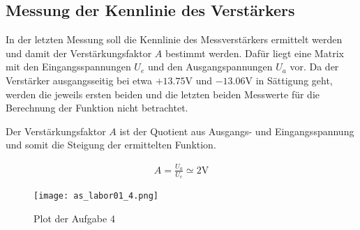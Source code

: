 \subsection{Messung der Kennlinie des Verstärkers}

In der letzten Messung soll die Kennlinie des Messverstärkers ermittelt
werden und damit der Verstärkungsfaktor $A$ bestimmt werden. Dafür liegt
eine Matrix mit den Eingangsspannungen $U_e$ und den Ausgangspannungen
$U_a$ vor. Da der Verstärker ausgangsseitig bei etwa $+13.75\mathrm{V}$
und $-13.06\mathrm{V}$ in Sättigung geht, werden die jeweils ersten beiden
und die letzten beiden Messwerte für die Berechnung der Funktion nicht
betrachtet.

Der Verstärkungsfaktor $A$ ist der Quotient aus Ausgangs- und Eingangsspannung
und somit die Steigung der ermittelten Funktion.

\begin{equation} \label{eq141}
    \begin{split}
        A=\frac{U_a}{U_e}\simeq2 \mathrm{V}
    \end{split}
\end{equation}

\begin{figure}[H]
 \centering
 \texttt{[image: as\_labor01\_4.png]}
 \caption{Plot der Aufgabe 4}
 \label{fig:PlotAufgabe4}
\end{figure}